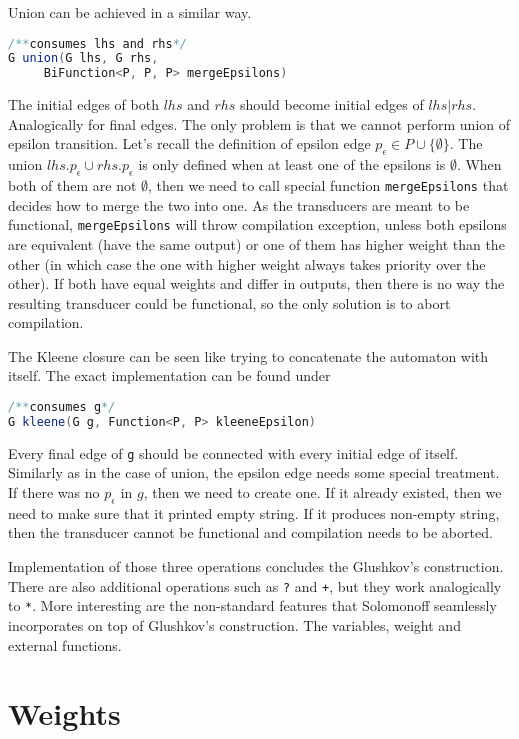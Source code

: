 \documentclass[12pt]{article}
\begin{document}
Union can be achieved in a similar way. 
\begin{lstlisting}[language=java]
/**consumes lhs and rhs*/
G union(G lhs, G rhs, 
     BiFunction<P, P, P> mergeEpsilons)
\end{lstlisting}
The initial edges of both $lhs$ and $rhs$ should become initial edges of $lhs|rhs$. Analogically for final edges. The only problem is that we cannot perform union of epsilon transition. Let's recall the definition of epsilon edge $p_\epsilon \in P \cup \{\emptyset\}$. The union  $lhs.p_\epsilon \cup rhs.p_\epsilon$ is only defined when at least one of the epsilons is $\emptyset$. When both of them are not $\emptyset$, then we need to call special function \texttt{mergeEpsilons} that decides how to merge the two into one. As the transducers are meant to be functional, \texttt{mergeEpsilons} will throw compilation exception, unless both epsilons are equivalent (have the same output) or one of them has higher weight than the other (in which case the one with higher weight always takes priority over the other). If both have equal weights and differ in outputs, then there is no way the resulting transducer could be functional, so the only solution is to abort compilation. 

The Kleene closure can be seen like trying to concatenate the automaton with itself. The exact implementation can be found under
\begin{lstlisting}[language=java]
/**consumes g*/
G kleene(G g, Function<P, P> kleeneEpsilon)
\end{lstlisting}
Every final edge of \texttt{g} should be connected with every initial edge of itself.  Similarly as in the case of union, the epsilon edge needs some special treatment. If there was no $p_\epsilon$ in $g$, then we need to create one. If it already existed, then we need to make sure that it printed empty string. If it produces non-empty string, then the transducer cannot be functional and compilation needs to be aborted.

Implementation of those three operations concludes the Glushkov's construction. There are also additional operations such as \texttt{?} and \texttt{+}, but they work analogically to \texttt{*}. More interesting are the non-standard features that Solomonoff seamlessly incorporates on top of Glushkov's construction. The variables, weight and external functions.

\section{Weights}
\end{document}
